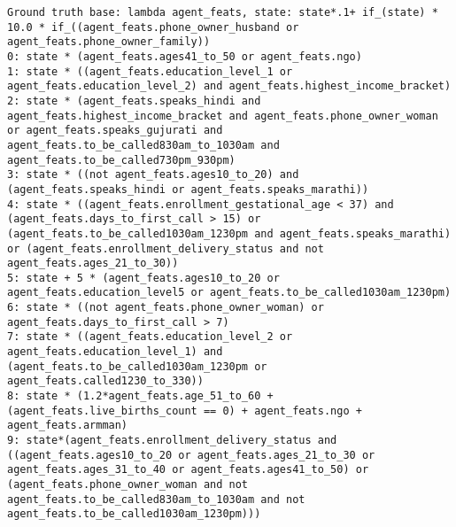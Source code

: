 \begin{lstlisting}
Ground truth base: lambda agent_feats, state: state*.1+ if_(state) * 10.0 * if_((agent_feats.phone_owner_husband or agent_feats.phone_owner_family))
0: state * (agent_feats.ages41_to_50 or agent_feats.ngo) 
1: state * ((agent_feats.education_level_1 or agent_feats.education_level_2) and agent_feats.highest_income_bracket) 
2: state * (agent_feats.speaks_hindi and agent_feats.highest_income_bracket and agent_feats.phone_owner_woman or agent_feats.speaks_gujurati and agent_feats.to_be_called830am_to_1030am and agent_feats.to_be_called730pm_930pm) 
3: state * ((not agent_feats.ages10_to_20) and (agent_feats.speaks_hindi or agent_feats.speaks_marathi)) 
4: state * ((agent_feats.enrollment_gestational_age < 37) and (agent_feats.days_to_first_call > 15) or (agent_feats.to_be_called1030am_1230pm and agent_feats.speaks_marathi) or (agent_feats.enrollment_delivery_status and not agent_feats.ages_21_to_30)) 
5: state + 5 * (agent_feats.ages10_to_20 or agent_feats.education_level5 or agent_feats.to_be_called1030am_1230pm) 
6: state * ((not agent_feats.phone_owner_woman) or agent_feats.days_to_first_call > 7) 
7: state * ((agent_feats.education_level_2 or agent_feats.education_level_1) and (agent_feats.to_be_called1030am_1230pm or agent_feats.called1230_to_330)) 
8: state * (1.2*agent_feats.age_51_to_60 + (agent_feats.live_births_count == 0) + agent_feats.ngo + agent_feats.armman) 
9: state*(agent_feats.enrollment_delivery_status and ((agent_feats.ages10_to_20 or agent_feats.ages_21_to_30 or agent_feats.ages_31_to_40 or agent_feats.ages41_to_50) or (agent_feats.phone_owner_woman and not agent_feats.to_be_called830am_to_1030am and not agent_feats.to_be_called1030am_1230pm))) 

\end{lstlisting}
